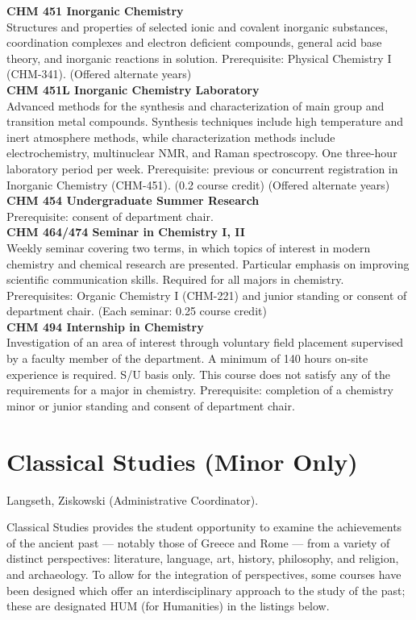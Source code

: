 \documentclass[
  letterpaper,
]{scrbook}
\begin{document}
\textbf{CHM 451 Inorganic Chemistry}\\
Structures and properties of selected ionic and covalent inorganic
substances, coordination complexes and electron deficient compounds,
general acid base theory, and inorganic reactions in solution.
Prerequisite: Physical Chemistry I (CHM-341). (Offered alternate
years)\\
\textbf{CHM 451L Inorganic Chemistry Laboratory}\\
Advanced methods for the synthesis and characterization of main group
and transition metal compounds. Synthesis techniques include high
temperature and inert atmosphere methods, while characterization methods
include electrochemistry, multinuclear NMR, and Raman spectroscopy. One
three-hour laboratory period per week. Prerequisite: previous or
concurrent registration in Inorganic Chemistry (CHM-451). (0.2 course
credit) (Offered alternate years)\\
\textbf{CHM 454 Undergraduate Summer Research}\\
Prerequisite: consent of department chair.\\
\textbf{CHM 464/474 Seminar in Chemistry I, II}\\
Weekly seminar covering two terms, in which topics of interest in modern
chemistry and chemical research are presented. Particular emphasis on
improving scientific communication skills. Required for all majors in
chemistry. Prerequisites: Organic Chemistry I (CHM-221) and junior
standing or consent of department chair. (Each seminar: 0.25 course
credit)\\
\textbf{CHM 494 Internship in Chemistry}\\
Investigation of an area of interest through voluntary field placement
supervised by a faculty member of the department. A minimum of 140 hours
on-site experience is required. S/U basis only. This course does not
satisfy any of the requirements for a major in chemistry. Prerequisite:
completion of a chemistry minor or junior standing and consent of
department chair.

\section{Classical Studies (Minor
Only)}\label{classical-studies-minor-only}

Langseth, Ziskowski (Administrative Coordinator).

Classical Studies provides the student opportunity to examine the
achievements of the ancient past --- notably those of Greece and Rome
--- from a variety of distinct perspectives: literature, language, art,
history, philosophy, and religion, and archaeology. To allow for the
integration of perspectives, some courses have been designed which offer
an interdisciplinary approach to the study of the past; these are
designated HUM (for Humanities) in the listings below.
\end{document}
